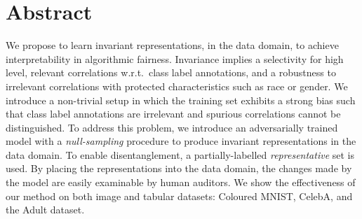 %
\section*{Abstract}
%
\noindent
%
We propose to learn invariant representations, in the data domain, to achieve interpretability in
algorithmic fairness. Invariance implies a selectivity for high level, relevant correlations
w.r.t.\ class label annotations, and a robustness to irrelevant correlations with protected
characteristics such as race or gender. We introduce a non-trivial setup in which the training set
exhibits a strong bias such that class label annotations are irrelevant and spurious correlations
cannot be distinguished. To address this problem, we introduce an adversarially trained model with
a \emph{null-sampling} procedure to produce invariant representations in the data domain. To enable
disentanglement, a partially-labelled \emph{representative} set is used. By placing the
representations into the data domain, the changes made by the model are easily examinable by human
auditors. We show the effectiveness of our method on both image and tabular datasets: Coloured
MNIST, CelebA, and the Adult dataset.
